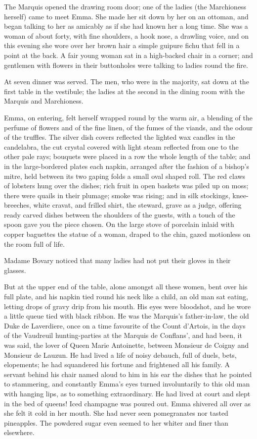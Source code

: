 \documentclass{tufte-book}
\begin{document}
The Marquis opened the drawing room door; one of the ladies (the
Marchioness herself) came to meet Emma. She made her sit down by her on
an ottoman, and began talking to her as amicably as if she had known her
a long time. She was a woman of about forty, with fine shoulders, a hook
nose, a drawling voice, and on this evening she wore over her brown hair
a simple guipure fichu that fell in a point at the back. A fair young
woman sat in a high-backed chair in a corner; and gentlemen with flowers
in their buttonholes were talking to ladies round the fire.

At seven dinner was served. The men, who were in the majority, sat down
at the first table in the vestibule; the ladies at the second in the
dining room with the Marquis and Marchioness.

Emma, on entering, felt herself wrapped round by the warm air, a
blending of the perfume of flowers and of the fine linen, of the fumes
of the viands, and the odour of the truffles. The silver dish covers
reflected the lighted wax candles in the candelabra, the cut crystal
covered with light steam reflected from one to the other pale rays;
bouquets were placed in a row the whole length of the table; and in
the large-bordered plates each napkin, arranged after the fashion of a
bishop's mitre, held between its two gaping folds a small oval shaped
roll. The red claws of lobsters hung over the dishes; rich fruit in open
baskets was piled up on moss; there were quails in their plumage; smoke
was rising; and in silk stockings, knee-breeches, white cravat, and
frilled shirt, the steward, grave as a judge, offering ready carved
dishes between the shoulders of the guests, with a touch of the spoon
gave you the piece chosen. On the large stove of porcelain inlaid
with copper baguettes the statue of a woman, draped to the chin, gazed
motionless on the room full of life.

Madame Bovary noticed that many ladies had not put their gloves in their
glasses.

But at the upper end of the table, alone amongst all these women, bent
over his full plate, and his napkin tied round his neck like a child, an
old man sat eating, letting drops of gravy drip from his mouth. His eyes
were bloodshot, and he wore a little queue tied with black ribbon. He
was the Marquis's father-in-law, the old Duke de Laverdiere, once on
a time favourite of the Count d'Artois, in the days of the Vaudreuil
hunting-parties at the Marquis de Conflans', and had been, it was said,
the lover of Queen Marie Antoinette, between Monsieur de Coigny and
Monsieur de Lauzun. He had lived a life of noisy debauch, full of duels,
bets, elopements; he had squandered his fortune and frightened all his
family. A servant behind his chair named aloud to him in his ear the
dishes that he pointed to stammering, and constantly Emma's eyes
turned involuntarily to this old man with hanging lips, as to something
extraordinary. He had lived at court and slept in the bed of queens!
Iced champagne was poured out. Emma shivered all over as she felt
it cold in her mouth. She had never seen pomegranates nor tasted
pineapples. The powdered sugar even seemed to her whiter and finer than
elsewhere.
\end{document}
